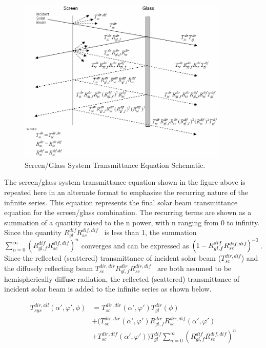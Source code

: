 \begin{figure}[hbtp] %
\centering
\includegraphics[width=0.9\textwidth, height=0.9\textheight, keepaspectratio=true]{media/image1231.png}
\caption{Screen/Glass System Transmittance Equation Schematic. \protect \label{fig:screenglass-system-transmittance-equation}}
\end{figure}

The screen/glass system transmittance equation shown in the figure above is repeated here in an alternate format to emphasize the recurring nature of the infinite series. This equation represents the final solar beam transmittance equation for the screen/glass combination. The recurring terms are shown as a summation of a quantity raised to the n power, with n ranging from 0 to infinity. Since the quantity \(R_{gl}^{dif}R_{sc}^{dif,dif}\) ~is less than 1, the summation \(\sum\limits_{n = 0}^\infty {{{(R_{gl,f}^{dif}R_{sc}^{dif,dif})}^n}}\) converges and can be expressed as $\PB{1-R_{gl,f}^{dif}R_{sc}^{dif,dif}}^{-1}$.  Since the reflected (scattered) transmittance of incident solar beam (\(T_{sc}^{dir,dif}\)) and the diffusely reflecting beam \(T_{sc}^{dir,dir}R_{gl,f}^{dir}R_{sc}^{dir,dif}\) ~are both assumed to be hemispherically diffuse radiation, the reflected (scattered) transmittance of incident solar beam is added to the infinite series as shown below.

\begin{equation}
\begin{array}{rl}
  T_{sys}^{dir,all}(\alpha ',\varphi ',\phi ) &= T_{sc}^{dir,dir}(\alpha ',\varphi ')T_{gl}^{dir}\left( \phi  \right) \\
                                              &+ (T_{sc}^{dir,dir}(\alpha ',\varphi ')R_{gl,f}^{dir}R_{sc}^{dir,dif}(\alpha ',\varphi ') \\
                                              &+ T_{sc}^{dir,dif}(\alpha ',\varphi '))T_{gl}^{dif}\sum\limits_{n = 0}^\infty  {{{(R_{gl,f}^{dif}R_{sc}^{dif,dif})}^n}} 
\end{array}
\end{equation}

